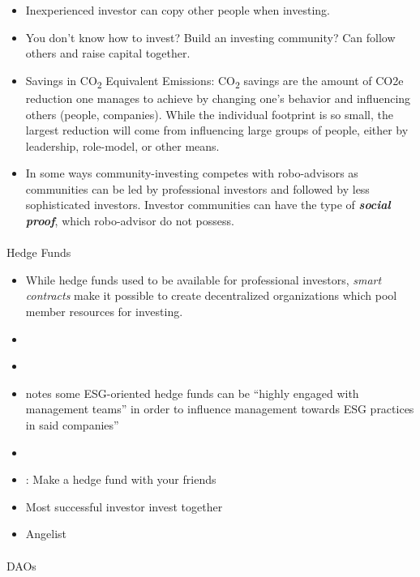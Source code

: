 \documentclass[
  letterpaper,
  DIV=11,
  numbers=noendperiod]{scrartcl}
\makeatletter
\let\oldparagraph\paragraph
\renewcommand{\paragraph}{
    \@ifstar
      \xxxParagraphStar
      \xxxParagraphNoStar
  }
\newcommand{\xxxParagraphStar}[1]{\oldparagraph*{#1}\mbox{}}
\newcommand{\xxxParagraphNoStar}[1]{\oldparagraph{#1}\mbox{}}
\providecommand{\tightlist}{%
  \setlength{\itemsep}{0pt}\setlength{\parskip}{0pt}}\usepackage{longtable,booktabs,array}
\makeatother
\begin{document}
\begin{itemize}
\tightlist
\item
  Inexperienced investor can copy other people when investing.
\item
  You don't know how to invest? Build an investing community? Can follow
  others and raise capital together.
\item
  Savings in CO\textsubscript{2} Equivalent Emissions:
  CO\textsubscript{2} savings are the amount of CO2e reduction one
  manages to achieve by changing one's behavior and influencing others
  (people, companies). While the individual footprint is so small, the
  largest reduction will come from influencing large groups of people,
  either by leadership, role-model, or other means.
\item
  In some ways community-investing competes with robo-advisors as
  communities can be led by professional investors and followed by less
  sophisticated investors. Investor communities can have the type of
  \textbf{\emph{social proof}}, which robo-advisor do not possess.
\end{itemize}

\paragraph{Hedge Funds}\label{hedge-funds}

\begin{itemize}
\item
  While hedge funds used to be available for professional investors,
  \emph{smart contracts} make it possible to create decentralized
  organizations which pool member resources for investing.
\item
  \citet{nathanreiffDecentralizedAutonomousOrganization2023}
\item
  \citet{ianbezekItTimeEveryone2021}
\item
  \citet{blackrockESGInvestingHedge} notes some ESG-oriented hedge funds
  can be ``highly engaged with management teams'' in order to influence
  management towards ESG practices in said companies''
\item
  \citet{ESGHedgeFunds2021}
\item
  \citet{hedgeHedgeMakeHedge2023}: Make a hedge fund with your friends
\item
  Most successful investor invest together
\item
  Angelist
\end{itemize}

\paragraph{DAOs}\label{daos}
\end{document}
